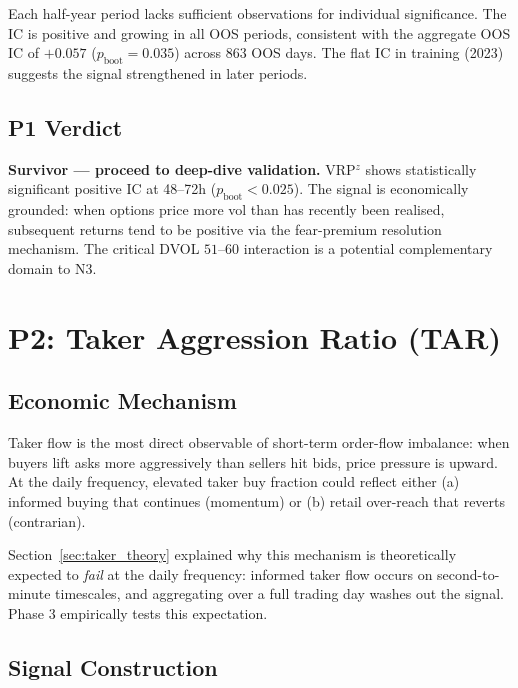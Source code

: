 \documentclass[12pt, a4paper]{article}
\theoremstyle{plain}
\theoremstyle{definition}
\begin{document}
Each half-year period lacks sufficient observations for individual
significance.  The IC is positive and growing in all OOS periods,
consistent with the aggregate OOS IC of $+0.057$ ($p_{\mathrm{boot}}
= 0.035$) across 863 OOS days.  The flat IC in training (2023) suggests
the signal strengthened in later periods.

\subsection{P1 Verdict}

\textbf{Survivor --- proceed to deep-dive validation.}  VRP$^z$ shows
statistically significant positive IC at 48--72h ($p_{\mathrm{boot}} < 0.025$).
The signal is economically grounded: when options price more vol than
has recently been realised, subsequent returns tend to be positive via
the fear-premium resolution mechanism.  The critical DVOL $51$--$60$
interaction is a potential complementary domain to N3.

\section{P2: Taker Aggression Ratio (TAR)}
\label{sec:p2}

\subsection{Economic Mechanism}

Taker flow is the most direct observable of short-term order-flow
imbalance: when buyers lift asks more aggressively than sellers hit bids,
price pressure is upward.  At the daily frequency, elevated taker buy
fraction could reflect either (a) informed buying that continues
(momentum) or (b) retail over-reach that reverts (contrarian).

Section~\ref{sec:taker_theory} explained why this mechanism is
theoretically expected to \emph{fail} at the daily frequency: informed
taker flow occurs on second-to-minute timescales, and aggregating over
a full trading day washes out the signal.  Phase 3 empirically tests
this expectation.

\subsection{Signal Construction}
\end{document}
